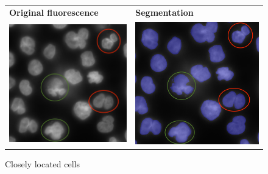 \begin{figure}[H]
    \centering
    \centering
        \begin{tabularx}{\textwidth}{YY}
            \textbf{Original fluorescence} &
            \textbf{Segmentation} \\
            \includegraphics{bilder/close-located-cells/original.png} & \includegraphics{bilder/close-located-cells/segmented.png}
        \end{tabularx}
    \caption{Closely located cells}
    \label{fig:closely-located-cells}
\end{figure}

